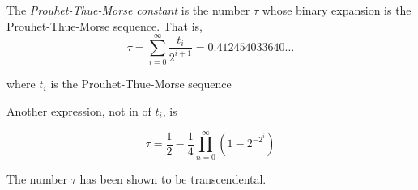 \documentclass[12pt]{article}
\begin{document}
The {\em Prouhet-Thue-Morse constant} is the number $\tau$ whose binary expansion is the Prouhet-Thue-Morse sequence.  That is,
\[ \tau = \sum_{i=0}^{\infty} \frac{t_i}{2^{i+1}} = 0.412454033640 \ldots \]

where $t_i$ is the Prouhet-Thue-Morse sequence

Another expression, not in  of $t_i$, is

\[ \tau = \frac{1}{2} - \frac{1}{4} \prod_{n=0}^{\infty} ( 1 - 2^{-2^i} ) \]

The number $\tau$ has been shown to be transcendental.
\end{document}
